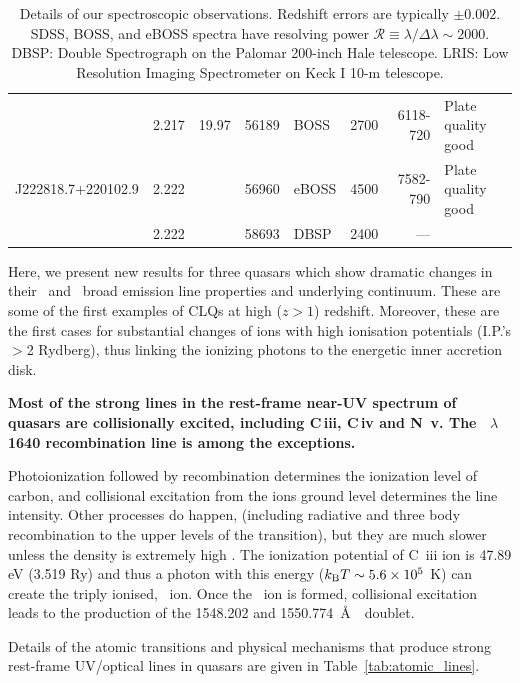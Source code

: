 \documentclass[fleqn,usenatbib]{mnras}
\begin{document}
\begin{table}
\begin{tabular}{l l   r ll  r r l}
                                      & 2.217                               & 19.97          &  56189                    &  BOSS                                    &  2700            &   6118-720          & Plate quality good \\
 J222818.7+220102.9   & 2.222                               &                    &  56960                     & eBOSS                                    &  4500            &   7582-790          & Plate quality good \\ 
                                     &  2.222                               &                    &  58693                    &  DBSP                                    & 2400             &    ---                        &    \\
    \hline \hline   
  \end{tabular}
  \caption{Details of our spectroscopic observations.  Redshift errors are
    typically $\pm 0.002$.  SDSS, BOSS, and eBOSS spectra have
    resolving power $\mathcal{R} \equiv \lambda / \Delta \lambda \sim 2000$.  DBSP: Double Spectrograph on the Palomar
    200-inch Hale telescope.  LRIS: Low Resolution Imaging Spectrometer on Keck
    I 10-m telescope.} 
  \label{tab:obs_notes}
\end{table}

Here, we present new results for three quasars which show dramatic
changes in their \civ\ and \ciii\ broad emission line properties and
underlying continuum. These are some of the first examples of CLQs at
high ($z>1$) redshift. Moreover, these are the first cases for
substantial changes of ions with high ionisation potentials (I.P.'s
$>$2 Rydberg), thus linking the ionizing photons to the energetic
inner accretion disk.

{\bf 
 Most of the strong lines in the rest-frame near-UV spectrum of quasars are
collisionally excited, including C\,{\sc iii}, C\,{\sc iv} and N\,{\sc
v}.  The \heii~$\lambda$1640 recombination line is among the exceptions.

Photoionization followed by recombination determines the ionization
level of carbon, and collisional excitation from the ions ground level 
determines the line intensity. Other processes do happen,
(including radiative and three body recombination to the upper levels 
of the transition), but they are much slower unless the density is
extremely high \citep[e.g., ][and H. Netzer,
priv. comm.]{Dopita_Sutherland2003book}. The ionization potential of C\,{\sc
iii} ion is 47.89 eV (3.519 Ry) and thus a photon with this energy
($k_{\rm B} T \sim 5.6 \times10^{5}$ K) can create the triply ionised,
\civ\ ion. Once the \civ\ ion is formed, collisional excitation leads to
the production of the 1548.202 and 1550.774~\AA\ \civ\ doublet.
}
Details of the atomic transitions and physical mechanisms that produce
strong rest-frame UV/optical lines in quasars are given in
Table~\ref{tab:atomic_lines}.
\end{document}

